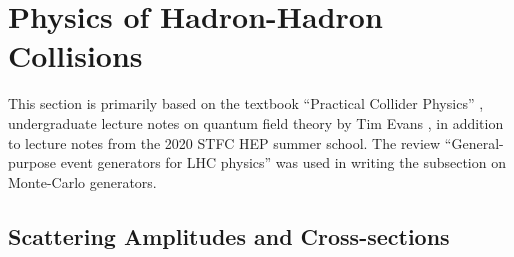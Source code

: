 \section{Physics of Hadron-Hadron Collisions}
This section is primarily based on the textbook ``Practical Collider Physics'' \cite{Buckley:PCP}, undergraduate lecture notes on quantum field theory by Tim Evans \cite{timevans}, in addition to lecture notes from the 2020 STFC HEP summer school. The review ``General-purpose event generators for LHC physics'' \cite{Buckley:evgens} was used in writing the subsection on Monte-Carlo generators.

\subsection{Scattering Amplitudes and Cross-sections}


